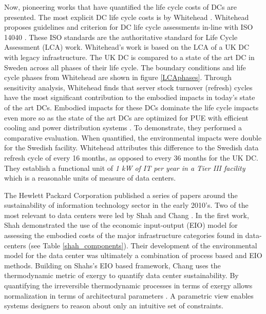     Now, pioneering works that have quantified the life cycle costs of DCs are presented. The most explicit DC life cycle costs is by Whitehead \cite{whitehead15}. Whitehead proposes guidelines and criterion for DC life cycle assessments in-line with ISO 14040 \cite{ISO14040}. These ISO standards are the authoritative standard for Life Cycle Assessment (LCA) work.  Whitehead's work is based on the LCA of a UK DC with legacy infrastructure. The UK DC is compared to a state of the art DC in Sweden across all phases of their life cycle. The boundary conditions and life cycle phases from Whitehead are shown in figure \ref{LCAphases}. Through sensitivity analysis, Whitehead finds that server stock turnover (refresh) cycles have  the most significant contribution to the embodied impacts in today's state of the art DCs.  Embodied impacts for these DCs dominate the life cycle impacts even more so as the state of the art DCs are optimized for PUE with efficient cooling and power distribution systems . To demonstrate, they performed a comparative evaluation. When quantified, the environmental impacts were double for the Swedish facility. Whitehead attributes this difference to the Swedish data refresh cycle of every 16 months, as opposed to every 36 months for the UK DC. They establish a functional unit of \textit{1 kW of IT per year in a Tier III facility} which is a reasonable units of measure of data centers.
    
    
    
    The Hewlett Packard Corporation published a series of papers around the sustainability of information technology sector in the early 2010's. Two of the most relevant to data centers were led by Shah and Chang \cite{shah11, shah12}. In the first work, Shah demonstrated the use of the economic input-output (EIO) model for assessing the embodied costs of the major infrastructure categories found in data-centers (see Table \ref{shah_components}). Their development of the environmental model for the data center was ultimately a combination of process based and EIO methods. Building on Shahs's EIO based framework, Chang uses the thermodynamic metric of exergy to quantify data center sustainability. By quantifying the irreversible thermodynamic processes in terms of exergy allows normalization in terms of architectural parameters \cite{shah12}. A parametric view enables systems designers to reason about only an intuitive set of constraints.
    
    
    
